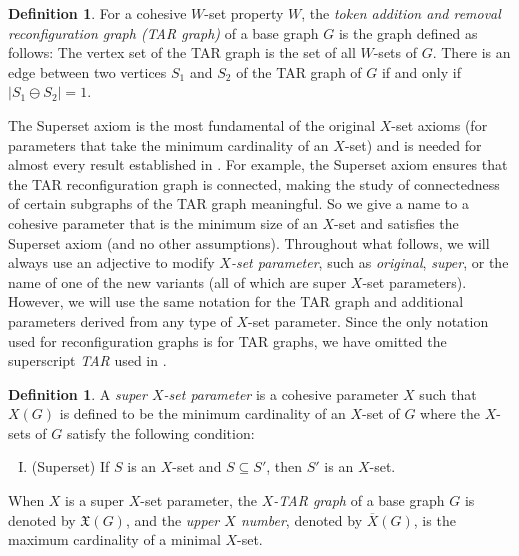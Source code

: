 \documentclass{article}
\numberwithin{figure}{section}
\numberwithin{table}{section}
\numberwithin{equation}{section}
\theoremstyle{definition}
\theoremstyle{definition}
\newtheorem{defn}[thm]{Definition}
\theoremstyle{definition}
\newcommand{\ben}{\begin{enumerate}}
\newcommand{\een}{\end{enumerate}}
\newcommand{\ol}{\overline}
\newcommand{\xbar}{\ol X}
\newcommand{\xtar}{\mathfrak{X}}%
\begin{document}
{\begin{defn}
  For a cohesive $W$-set property $W$,   the {\em token addition and removal  reconfiguration graph (TAR graph)}  of a  base graph  $G$ is the graph defined as follows:  The vertex set of the TAR graph is  the set of all  $W$-sets of $G$.  There is an edge between  two vertices  $S_1$ and $S_2$ of the TAR graph of $G$ if and only if  $|S_1 \ominus S_2|=1$.
\end{defn}

 
 




The Superset axiom is the most fundamental of the original $X$-set axioms (for parameters that take the minimum cardinality of an $X$-set) and is needed for almost every result established in \cite{PDrecon, XTARiso}. For example,  the Superset axiom ensures that the TAR reconfiguration graph is connected,  making the study of connectedness of certain subgraphs of the TAR graph meaningful.   
So we give a name to a cohesive  parameter that is the minimum size of an $X$-set and  satisfies the Superset axiom (and no other assumptions).   
Throughout what follows, we will always use an adjective  to modify \emph{$X$-set parameter}, such as \emph{original}, \emph{super}, or the name of one of the new variants (all of which are super $X$-set parameters).  However, we will use the same notation for the TAR graph and additional parameters derived from any type of $X$-set parameter.  Since  the only notation used for reconfiguration   graphs is for  TAR graphs, we have omitted the superscript \emph{TAR} used in \cite{PDrecon, XTARiso}.

\begin{defn}\label{d:superX}
 A \emph{super $X$-set 
parameter}  is a cohesive parameter $X$ such that $X(G)$ is defined to be the minimum cardinality of an $X$-set of $G$  where   the $X$-sets of $G$ satisfy the following condition:  
 \ben[(I)]
\item(Superset) 
If $S$ is an $X$-set and $S\subseteq S'$, then $S'$ is an $X$-set.
\een

 When $X$ is a super $X$-set parameter, the {\em $X$-TAR graph}  of a  base graph  $G$ is denoted by  $\xtar(G)$, and the \emph{upper $X$ number}, denoted by  $\xbar(G)$, is the maximum cardinality of a minimal $X$-set.
  \end{defn}



}
\end{document}
